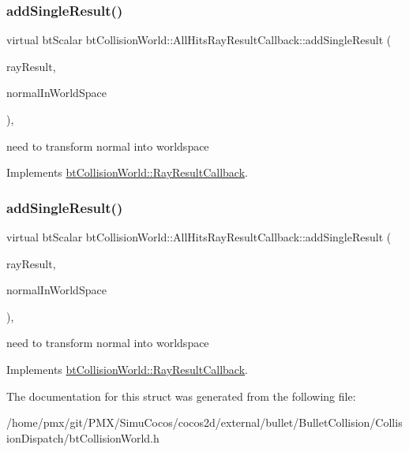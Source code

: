 \subsubsection{\texorpdfstring{add\+Single\+Result()}{addSingleResult()}\hspace{0.1cm}{\footnotesize\ttfamily [1/2]}}
{\footnotesize\ttfamily virtual bt\+Scalar bt\+Collision\+World\+::\+All\+Hits\+Ray\+Result\+Callback\+::add\+Single\+Result (\begin{DoxyParamCaption}\item[{\hyperlink{structbtCollisionWorld_1_1LocalRayResult}{Local\+Ray\+Result} \&}]{ray\+Result,  }\item[{bool}]{normal\+In\+World\+Space }\end{DoxyParamCaption})\hspace{0.3cm}{\ttfamily [inline]}, {\ttfamily [virtual]}}

need to transform normal into worldspace 

Implements \hyperlink{structbtCollisionWorld_1_1RayResultCallback}{bt\+Collision\+World\+::\+Ray\+Result\+Callback}.

\mbox{\label{structbtCollisionWorld_1_1AllHitsRayResultCallback_a351da818747c246011624b9cb613c29b}} 
\subsubsection{\texorpdfstring{add\+Single\+Result()}{addSingleResult()}\hspace{0.1cm}{\footnotesize\ttfamily [2/2]}}
{\footnotesize\ttfamily virtual bt\+Scalar bt\+Collision\+World\+::\+All\+Hits\+Ray\+Result\+Callback\+::add\+Single\+Result (\begin{DoxyParamCaption}\item[{\hyperlink{structbtCollisionWorld_1_1LocalRayResult}{Local\+Ray\+Result} \&}]{ray\+Result,  }\item[{bool}]{normal\+In\+World\+Space }\end{DoxyParamCaption})\hspace{0.3cm}{\ttfamily [inline]}, {\ttfamily [virtual]}}

need to transform normal into worldspace 

Implements \hyperlink{structbtCollisionWorld_1_1RayResultCallback}{bt\+Collision\+World\+::\+Ray\+Result\+Callback}.



The documentation for this struct was generated from the following file\+:\begin{DoxyCompactItemize}
\item 
/home/pmx/git/\+P\+M\+X/\+Simu\+Cocos/cocos2d/external/bullet/\+Bullet\+Collision/\+Collision\+Dispatch/bt\+Collision\+World.\+h\end{DoxyCompactItemize}
